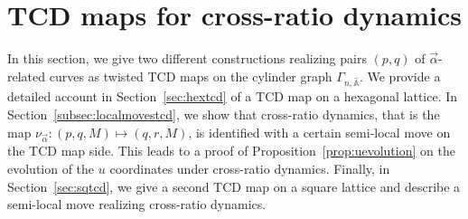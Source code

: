 \documentclass[pdftex]{sigma}
\numberwithin{equation}{section}
\newcommand{\A}{{\mathbb A}}
\begin{document}
\section{TCD maps for cross-ratio dynamics} \label{sec:crtcd12}
In this section, we give two different constructions realizing pairs $(p,q)$ of $\vec\alpha$-related curves as twisted TCD maps on the cylinder graph {$\Gamma_{n,\widehat\A}$}. We provide a detailed account in Section~\ref{sec:hextcd} of a TCD map on a hexagonal lattice. In Section~\ref{subsec:localmovestcd}, we show that cross-ratio dynamics, that is the map $\nu_{\vec \alpha}\colon (p,q,M) \mapsto (q,r,M)$, is identified with a certain semi-local move on the TCD map side. This leads to a proof of Proposition~\ref{prop:uevolution} on the evolution of the $u$ coordinates under cross-ratio dynamics. Finally, in Section~\ref{sec:sqtcd}, we give a second TCD map on a square lattice and describe a semi-local move realizing cross-ratio dynamics.
	
\end{document}

